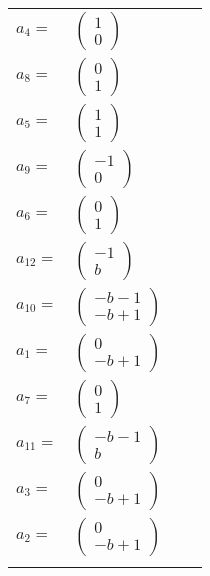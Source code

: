 \documentclass[1p]{elsarticle_modified}
\theoremstyle{definition}
\begin{document}
\begin{tabular}{m{7pt} m{180pt} m{7pt} m{180pt} }
\flushright $a_{4}=$&$\begin{pmatrix}1\\0\end{pmatrix}$ \\
\flushright $a_{8}=$&$\begin{pmatrix}0\\1\end{pmatrix}$ \\
\flushright $a_{5}=$&$\begin{pmatrix}1\\1\end{pmatrix}$ \\
\flushright $a_{9}=$&$\begin{pmatrix}-1\\0\end{pmatrix}$ \\
\flushright $a_{6}=$&$\begin{pmatrix}0\\1\end{pmatrix}$ \\
\flushright $a_{12}=$&$\begin{pmatrix}-1\\b\end{pmatrix}$ \\
\flushright $a_{10}=$&$\begin{pmatrix}- b-1\\- b+1\end{pmatrix}$ \\
\flushright $a_{1}=$&$\begin{pmatrix}0\\- b+1\end{pmatrix}$ \\
\flushright $a_{7}=$&$\begin{pmatrix}0\\1\end{pmatrix}$ \\
\flushright $a_{11}=$&$\begin{pmatrix}- b-1\\b\end{pmatrix}$ \\
\flushright $a_{3}=$&$\begin{pmatrix}0\\- b+1\end{pmatrix}$ \\
\flushright $a_{2}=$&$\begin{pmatrix}0\\- b+1\end{pmatrix}$\\&\end{tabular}
\end{document}
